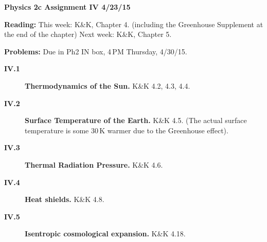 \documentclass[11pt]{article}
\def\hb{\hfill\break}
\begin{document}
%
\centerline{\large\bf Physics 2c \hfill Assignment IV \hfill  4/23/15}

\medskip
\begin{list}{}{\leftmargin 2.4cm  .2cm }
\item[{\bf Reading:}  \hfill ] This week: K\&K, Chapter 4. \hb
(including the Greenhouse Supplement at the end of the chapter) \hb
                               Next week: K\&K, Chapter 5.
\item[{\bf Problems:} \hfill ] Due in Ph2 IN box, 4\,PM  Thursday, 4/30/15.
\end{list}

\begin{description}

\item[{\bf IV.1} ] {\bf Thermodynamics of the Sun.} K\&K 4.2, 4.3, 4.4.

\item[{\bf IV.2} ] {\bf Surface Temperature of the Earth.} K\&K 4.5. \hb
(The actual surface temperature is some 30\,K warmer due to the Greenhouse effect).

\item[{\bf IV.3} ] {\bf Thermal Radiation Pressure.} K\&K 4.6.

\item[{\bf IV.4} ] {\bf Heat shields.} K\&K 4.8.

\item[{\bf IV.5} ] {\bf Isentropic cosmological expansion.} K\&K 4.18.

\end{description}
\end{document}
